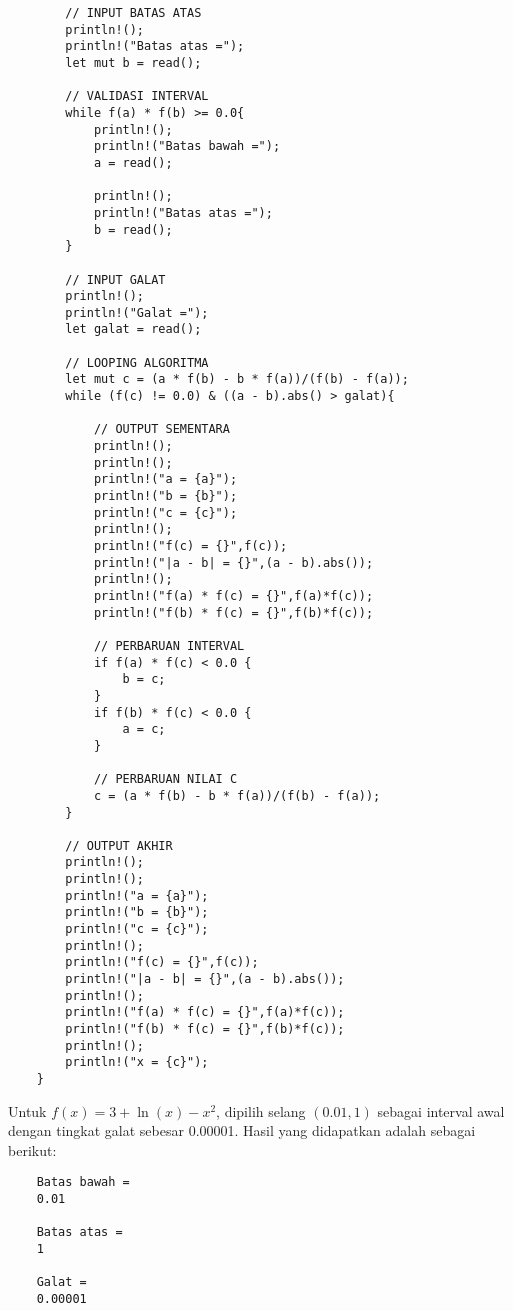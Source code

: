 \documentclass[12pt]{article}
\begin{document}
\begin{enumerate}
{\begin{lstlisting}
        // INPUT BATAS ATAS
        println!();
        println!("Batas atas =");
        let mut b = read();

        // VALIDASI INTERVAL
        while f(a) * f(b) >= 0.0{
            println!();
            println!("Batas bawah =");
            a = read();

            println!();
            println!("Batas atas =");
            b = read();
        }

        // INPUT GALAT
        println!();
        println!("Galat =");
        let galat = read();
        
        // LOOPING ALGORITMA
        let mut c = (a * f(b) - b * f(a))/(f(b) - f(a));
        while (f(c) != 0.0) & ((a - b).abs() > galat){

            // OUTPUT SEMENTARA
            println!();
            println!();
            println!("a = {a}");
            println!("b = {b}");
            println!("c = {c}");
            println!();
            println!("f(c) = {}",f(c));
            println!("|a - b| = {}",(a - b).abs());
            println!();
            println!("f(a) * f(c) = {}",f(a)*f(c));
            println!("f(b) * f(c) = {}",f(b)*f(c));
            
            // PERBARUAN INTERVAL
            if f(a) * f(c) < 0.0 {
                b = c;
            }
            if f(b) * f(c) < 0.0 {
                a = c;
            }
            
            // PERBARUAN NILAI C
            c = (a * f(b) - b * f(a))/(f(b) - f(a));
        }

        // OUTPUT AKHIR
        println!();
        println!();
        println!("a = {a}");
        println!("b = {b}");
        println!("c = {c}");
        println!();
        println!("f(c) = {}",f(c));
        println!("|a - b| = {}",(a - b).abs());
        println!();
        println!("f(a) * f(c) = {}",f(a)*f(c));
        println!("f(b) * f(c) = {}",f(b)*f(c));
        println!();
        println!("x = {c}");
    }            
        \end{lstlisting}

        Untuk $ f(x) = 3 + \ln(x) - x^2 $, dipilih selang $ (0.01,1) $ sebagai interval awal dengan tingkat galat sebesar 0.00001. Hasil yang didapatkan adalah sebagai berikut:
        \begin{lstlisting}
    Batas bawah =
    0.01

    Batas atas =
    1

    Galat =
    0.00001



\end{lstlisting}}
\end{enumerate}
\end{document}
